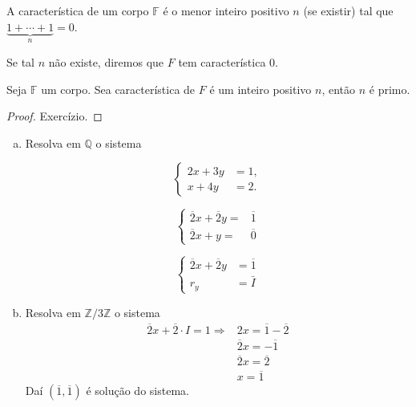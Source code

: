 \begin{definition}
	A característica de um corpo $\mathbb{F}$ é o menor inteiro positivo $n$ (se existir) tal que $\underbrace{1+\cdots+1}_{n}=0$.

	Se tal $n$ não existe, diremos que $F$ tem característica $0$.
\end{definition}

\begin{proposition}
	Seja $\mathbb{F}$ um corpo.
	Sea característica de $F$ é um inteiro positivo $n$, então $n$ é primo.
\end{proposition}

\begin{proof}
	Exercízio.
\end{proof}

\begin{example}
	\begin{enumerate}[a)]\leavevmode
		\item

		      Resolva em $\mathbb{Q}$ o sistema

		      \[
			      \begin{cases}
				      2 x+3 y & =1, \\
				      x+4 y   & =2.
			      \end{cases}
		      \]


		      \[
			      \begin{cases}
				      \overline{2}x+\overline{2}y= & \overline{1} \\
				      \overline{2}x+y=             & \overline{0}
			      \end{cases}
		      \]

		      \[
			      \begin{cases}
				      \overline{2}x+\overline{2}y & =\overline{1} \\
				      r_{y}                       & =\bar{I}
			      \end{cases}
		      \]
		\item Resolva em $\mathbb{Z}/3\mathbb{Z}$ o sistema
		      \[
			      \begin{aligned}
				      \overline{2} x+\overline{2} \cdot I=1 \Rightarrow & 2 x=\overline{1}-\overline{2} \\
				                                                        & \overline{2} x=-\overline{1}  \\
				                                                        & \overline{2} x=\overline{2}   \\
				                                                        & x=\overline{1}
			      \end{aligned}
		      \]
		      Daí $\left(\overline{1},\overline{1}\right)$ é solução do sistema.
	\end{enumerate}
\end{example}